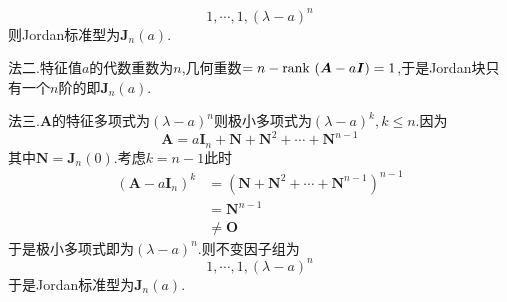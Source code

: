 {\begin{solution}
        \[
            1,\cdots,1,\left(\lambda-a\right)^n
        \]则Jordan标准型为$\bm{J}_n\left(a\right).$

        法二.特征值$a$的代数重数为$n$,几何重数$=n-\operatorname{rank\,} \left(
            \bm{A}-a\bm{I}
            \right)=1$,于是Jordan块只有一个$n$阶的即$\bm{J}_n\left(a\right)$.

        法三.$\bm{A}$的特征多项式为$\left(
            \lambda-a
            \right)^n$则极小多项式为$\left(
            \lambda-a
            \right)^k,k\leqslant n.$因为\[
            \bm{A}=a\bm{I}_n+\bm{N}+\bm{N}^2+\cdots+\bm{N}^{n-1}
        \]其中$\bm{N}=\bm{J}_n\left(0\right).$考虑$k=n-1$此时\begin{align*}
            \left(
            \bm{A}-a\bm{I}_n
            \right)^k & =\left(
            \bm{N}+\bm{N}^2+\cdots+\bm{N}^{n-1}
            \right)^{n-1}             \\
                      & =\bm{N}^{n-1} \\
                      & \neq \bm{O}
        \end{align*}于是极小多项式即为$\left(
            \lambda-a
            \right)^n$.则不变因子组为\[
            1,\cdots,1,\left(\lambda-a\right)^n\]于是Jordan标准型为$\bm{J}_n\left(a\right)$.
    \end{solution}
}
